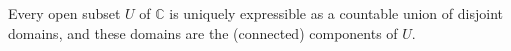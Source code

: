 Every open subset $U$ of $\mathbb{C}$ is uniquely expressible as a countable union of disjoint domains, and these domains are the (connected) components of $U$.
